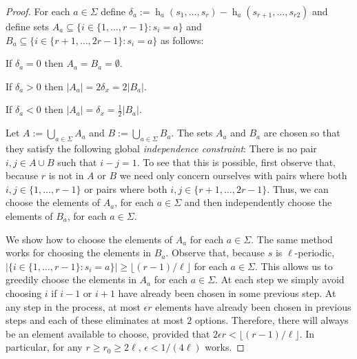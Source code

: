 \documentclass{patmorin}
\DeclareMathOperator{\hist}{h}
\begin{document}
\begin{proof}
    For each $a\in\Sigma$ define $\delta_a := \hist_a(s_1,\ldots,s_r)-\hist_a(s_{r+1},\ldots,s_{r2})$ and define sets $A_a\subseteq\{i\in \{1,\ldots,r-1\}: s_i=a\}$ and $B_a\subseteq\{i\in\{r+1,\ldots,2r-1\}:s_i=a\}$ as follows:
    \begin{compactenum}
        \item If $\delta_a=0$ then $A_a=B_a=\emptyset$.
        \item If $\delta_a>0$ then $|A_a|=2\delta_x=2|B_a|$.
        \item If $\delta_a<0$ then $|A_a|=\delta_x=\tfrac{1}{2}|B_a|$.
    \end{compactenum}
    Let $A:=\bigcup_{a\in\Sigma} A_a$ and $B:=\bigcup_{a\in\Sigma} B_a$.
    The sets $A_a$ and $B_a$ are chosen so that they satisfy the following global \emph{independence constraint}:  There is no pair $i,j\in A\cup B$ such that $i-j=1$.  To see that this is possible, first observe that, because $r$ is not in $A$ or $B$ we need only concern ourselves with pairs where both $i,j\in\{1,\ldots,r-1\}$ or pairs where both $i,j\in\{r+1,\ldots,2r-1\}$.  Thus, we can choose the elements of $A_a$, for each $a\in\Sigma$ and then independently choose the elements of $B_a$, for each $a\in\Sigma$.

    We show how to choose the elements of $A_a$ for each $a\in\Sigma$.  The same method works for choosing the elements in $B_a$. Observe that, because $s$ is $\ell$-periodic, $|\{i\in \{1,\ldots,r-1\}:s_i=a\}|\ge \lfloor(r-1)/\ell\rfloor$ for each $a\in\Sigma$.  This allows us to greedily choose the elements in $A_a$ for each $a\in\Sigma$. At each step we simply avoid choosing $i$ if $i-1$ or $i+1$ have already been chosen in some previous step.  At any step in the process, at most $\epsilon r$ elements have already been chosen in previous steps and each of these eliminates at most $2$ options.  Therefore, there will always be an element available to choose, provided that $2\epsilon r < \lfloor(r-1)/\ell\rfloor$.  In particular, for any $r\ge r_0\ge 2\ell$, $\epsilon < 1/(4\ell)$ works.


\end{proof}
\end{document}
